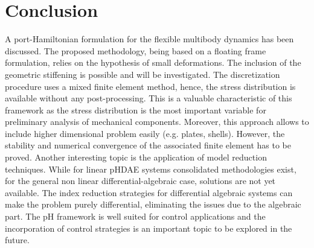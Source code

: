 \documentclass{svjour3}                     %
\begin{document}
\section{Conclusion}
A port-Hamiltonian formulation for the flexible multibody dynamics has been discussed. The proposed methodology, being based on a floating frame formulation, relies on the hypothesis of small deformations. The inclusion of the geometric stiffening is possible and will be investigated. The discretization procedure uses a mixed finite element method, hence, the stress distribution is available without any post-processing. This is a valuable characteristic of this framework as the stress distribution is the most important variable for preliminary analysis of mechanical components. Moreover, this approach allows to include higher dimensional problem easily (e.g. plates, shells). However, the stability and numerical convergence of the associated finite element has to be proved. Another interesting topic is the application of model reduction techniques. While for linear pHDAE systems consolidated methodologies exist, for the general non linear differential-algebraic case, solutions are not yet available. The index reduction strategies for differential algebraic systems can make the problem purely differential, eliminating the issues due to the algebraic part.  The pH framework is well suited for control applications and the incorporation of control strategies is an important topic to be explored in the future.


\end{document}
